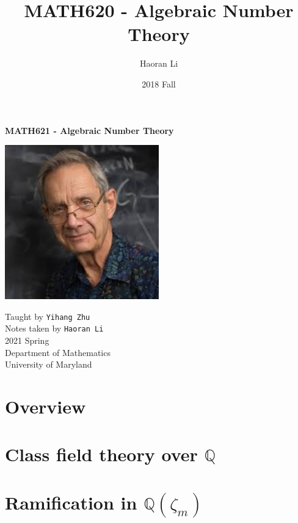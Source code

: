 \documentclass[a4paper,10pt]{article}
\title{MATH620 - Algebraic Number Theory}
\author{Haoran Li}
\date{2018 Fall}
\begin{document}
\sloppy %

\begin{titlepage}
\begin{center}
\vspace*{1cm}
\LARGE
\textbf{MATH621 - Algebraic Number Theory} \\
\vspace{2cm}
\begin{center}
\includegraphics[width=0.5\textwidth]{Pictures/Michael_Artin.jpg}
\end{center}
\vspace{2cm}
\normalsize
Taught by \texttt{Yihang Zhu} \\
Notes taken by \texttt{Haoran Li} \\
2021 Spring \\
\vspace{2cm}
Department of Mathematics\\
University of Maryland\\
\end{center}
\end{titlepage}

\tableofcontents
\newpage

\section{Overview}

\newpage

\section{Class field theory over $\mathbb Q$}

\newpage

\section{Ramification in $\mathbb Q(\zeta_m)$}

\newpage
\end{document}
